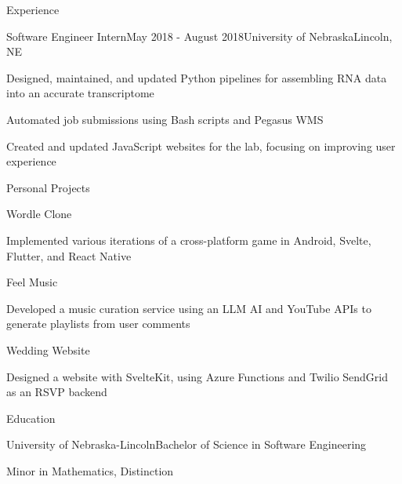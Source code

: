 \documentclass[
	10pt, %
]{article} %
\begin{document}
\begin{rSection}{Experience}
	\begin{rSubsection}{Software Engineer Intern}{May 2018 - August 2018}{University of Nebraska}{Lincoln, NE}
		\item Designed, maintained, and updated Python pipelines for assembling RNA data into an accurate transcriptome
		\item Automated job submissions using Bash scripts and Pegasus WMS
		\item Created and updated JavaScript websites for the lab, focusing on improving user experience
	\end{rSubsection}

\end{rSection}

\begin{rSection}{Personal Projects}

	\begin{rSubsection}{Wordle Clone}{}{}{}
		\item Implemented various iterations of a cross-platform game in Android, Svelte, Flutter, and React Native
	\end{rSubsection}

	\begin{rSubsection}{Feel Music}{}{}{}
		\item Developed a music curation service using an LLM AI and YouTube APIs to generate playlists from user comments
	\end{rSubsection}

	\begin{rSubsection}{Wedding Website}{}{}{}
		\item Designed a website with SvelteKit, using Azure Functions and Twilio SendGrid as an RSVP backend
	\end{rSubsection}

\end{rSection}

\begin{rSection}{Education}
	\begin{rSubsection}{University of Nebraska-Lincoln}{}{Bachelor of Science in Software Engineering}{}
		\item[] Minor in Mathematics, Distinction
	\end{rSubsection}
\end{rSection}
\end{document}
